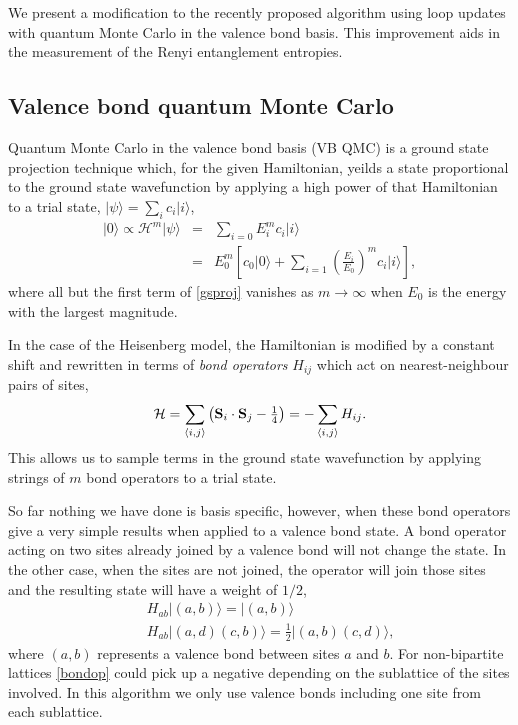 \documentclass[prb,aps,twocolumn,floatfix,amsmath,amssymb,superscriptaddress,tightenlines]{revtex4}
\begin{document}
We present a modification to the recently proposed algorithm using loop updates with quantum Monte Carlo in the valence bond basis.  This improvement aids in the measurement of the Renyi entanglement entropies.


\subsection{Valence bond quantum Monte Carlo}

Quantum Monte Carlo in the valence bond basis (VB QMC) is a ground state projection technique which, for the given Hamiltonian, yeilds a state proportional to the ground state wavefunction by applying a high power of that Hamiltonian to a  trial state, $\lvert \psi \rangle = \sum_i c_i \lvert i \rangle$,
\begin{eqnarray}
	\lvert 0 \rangle \propto \mathcal{H}^m \lvert \psi \rangle &=& \sum_{i=0} E_i^m c_i\lvert i \rangle  \\
	&=& E_0^m \left[ c_0 \lvert 0 \rangle + \sum_{i=1} \left(\frac{E_i}{E_0}\right) ^m c_i\lvert i \rangle \right] \label{gsproj},
\end{eqnarray}
where all but the first term of \eqref{gsproj} vanishes as $m \rightarrow \infty$ when $E_0$ is the energy with the largest magnitude.

In the case of the Heisenberg model, the Hamiltonian is modified by a constant shift and rewritten in terms of {\it bond operators} $H_{ij}$ which act on nearest-neighbour pairs of sites,
\begin{equation}
	 \mathcal{H} = \sum_{\langle i,j \rangle} \left({\bf S}_i \cdot {\bf S}_j - \tfrac{1}{4}\right) =  -\sum_{\langle i,j \rangle} H_{ij}.
\end{equation}
This allows us to sample terms in the ground state wavefunction by applying strings of $m$ bond operators to a trial state.

So far nothing we have done is basis specific, however, when these bond operators give a very simple results when applied to a valence bond state.  A bond operator acting on two sites already joined by a valence bond will not change the state.  In the other case, when the sites are not joined, the operator will join those sites and the resulting state will have a weight of $1/2$,
\begin{eqnarray}
	&&H_{ab}\lvert (a,b) \rangle=  \lvert (a,b) \rangle \label{bondop2}\\ 
	&&H_{ab}\lvert (a,d)(c,b) \rangle =  \tfrac{1}{2}\lvert (a,b)(c,d) \rangle, \label{bondop}
\end{eqnarray}
where $(a,b)$ represents a valence bond between sites $a$ and $b$.  
For non-bipartite lattices \eqref{bondop} could pick up a negative depending on the sublattice of the sites involved.  In this algorithm we only use valence bonds including one site from each sublattice.
\end{document}
